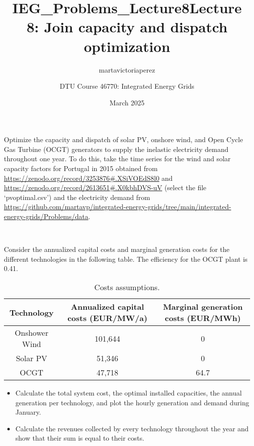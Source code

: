 \documentclass[10pt]{article}
\title{IEG_Problems_Lecture8}
\author{martavictoriaperez }
\date{March 2025}
\newenvironment{problem}[2][Problem]{\begin{trivlist}
\item[\hskip \labelsep {\bfseries #1}\hskip \labelsep {\bfseries #2.}]}{\end{trivlist}}
\begin{document}
 
\title{\textbf{Lecture 8: Join capacity and dispatch optimization}}
\author{
DTU Course 46770: Integrated Energy Grids }
\maketitle

\begin{problem}{8.1}

Optimize the capacity and dispatch of solar PV, onshore wind, and Open Cycle Gas Turbine (OCGT) generators to supply the inelastic electricity demand throughout one year. 
To do this, take the time series for the wind and solar capacity factors for Portugal in 2015 obtained from \url{https://zenodo.org/record/3253876#.XSiVOEdS8l0}
and \url{https://zenodo.org/record/2613651#.X0kbhDVS-uV} (select the file ‘pvoptimal.csv’) and the electricity demand from \url{https://github.com/martavp/integrated-energy-grids/tree/main/integrated-energy-grids/Problems/data}.

\

Consider the annualized capital costs and marginal generation costs for the different technologies in the following table. The efficiency for the OCGT plant is 0.41.


\begin{table}[h]
    \centering
    \begin{tabular}{ccc}
    \hline
        Technology & Annualized capital costs (EUR/MW/a) & Marginal generation costs (EUR/MWh) \\
    \hline
    Onshower Wind &  101,644 & 0 \\
         Solar PV &  51,346 & 0 \\
         OCGT & 47,718 &  64.7  \\
    \hline
    \end{tabular}
    \caption{Costs assumptions.}
    \label{tab:my_label}
\end{table}
\begin{itemize}
\item[a)] Calculate the total system cost, the optimal installed capacities, the annual generation per technology, and plot the hourly generation and demand during January.
\item[b)] Calculate the revenues collected by every technology throughout the year and show that their sum is equal to their costs. 
\end{itemize}

\end{problem}
\end{document}
